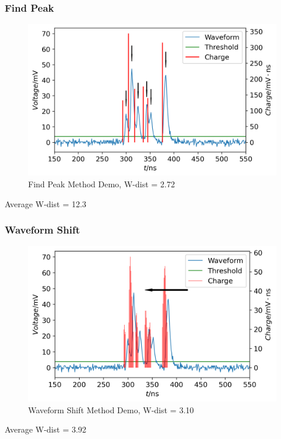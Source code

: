 \documentclass{beamer}
\begin{document}
\begin{frame}
\frametitle{Find Peak}
\begin{figure}
    \centering
    \caption{Find Peak Method Demo, W-dist = 2.72}
    \includegraphics[width=0.9\linewidth]{img/findpeak.png}
\end{figure}
\vspace{-4mm}
\begin{center}
    Average W-dist = 12.3
\end{center}
\end{frame}

\begin{frame}
\frametitle{Waveform Shift}
\begin{figure}
    \centering
    \caption{Waveform Shift Method Demo, W-dist = 3.10}
    \includegraphics[width=0.9\linewidth]{img/threshold.png}
\end{figure}
\vspace{-4mm}
\begin{center}
    Average W-dist = 3.92
\end{center}
\end{frame}
\end{document}
